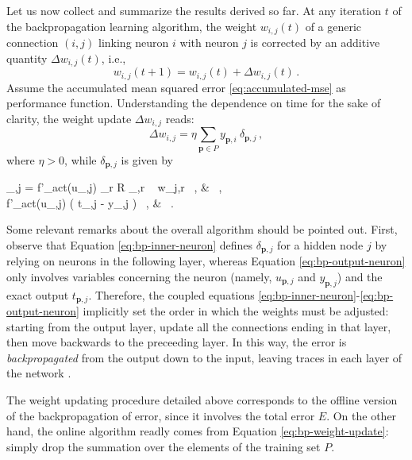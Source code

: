 \documentclass[12pt, a4paper, twoside, openright]{report}
\numberwithin{equation}{chapter}
\theoremstyle{theorem}
\theoremstyle{definition}
\theoremstyle{remark}
\theoremstyle{proposition}
\numberwithin{figure}{chapter}
\begin{document}
		Let us now collect and summarize the results derived so far. At any iteration $t$ of the backpropagation learning algorithm, the weight $w_{i,j}(t)$ of a generic connection $(i,j)$ linking neuron $i$ with neuron $j$ is corrected by an additive quantity $\Delta w_{i,j}(t)$, i.e., 
		\begin{equation*}
			w_{i,j}(t+1) = w_{i,j}(t) + \Delta w_{i,j}(t) \, .
		\end{equation*}
		Assume the accumulated mean squared error \eqref{eq:accumulated-mse} as performance function. Understanding the dependence on time for the sake of clarity, the weight update $\Delta w_{i,j}$ reads:
		\begin{equation*}
			\Delta w_{i,j} = \eta \sum_{\boldsymbol{p} \in P} y_{\boldsymbol{p},i} ~ \delta_{\boldsymbol{p},j} \, ,
		\end{equation*}
		where $\eta > 0$, while $\delta_{\boldsymbol{p},j}$ is given by
		\begin{subnumcases}{\delta_{,j} =}
			\label{eq:bp-inner-neuron}
		   	f'_{act}(u_{,j}) \sum_{r \in R} \delta_{,r} ~ w_{j,r} \, , &  \, , \\
		   	\label{eq:bp-output-neuron}
			 f'_{act}(u_{,j}) \left( t_{,j} - y_{,j} \right) \, , &  \, .
		\end{subnumcases}
				
		Some relevant remarks about the overall algorithm should be pointed out. First, observe that Equation \eqref{eq:bp-inner-neuron} defines $\delta_{\boldsymbol{p},j}$ for a hidden node $j$ by relying on neurons in the following layer, whereas Equation \eqref{eq:bp-output-neuron} only involves variables concerning the neuron (namely, $u_{\boldsymbol{p},j}$ and $y_{\boldsymbol{p},j}$) and the exact output $t_{\boldsymbol{p},j}$. Therefore, the coupled equations \eqref{eq:bp-inner-neuron}-\eqref{eq:bp-output-neuron} implicitly set the order in which the weights must be adjusted: starting from the output layer, update all the connections ending in that layer, then move backwards to the preceeding layer. In this way, the error is \emph{backpropagated} from the output down to the input, leaving traces in each layer of the network \cite{Kri, WH60}.
		
		The weight updating procedure detailed above corresponds to the offline version of the backpropagation of error, since it involves the total error $E$. On the other hand, the online algorithm readly comes from Equation \eqref{eq:bp-weight-update}: simply drop the summation over the elements of the training set $P$.
		
\end{document}

